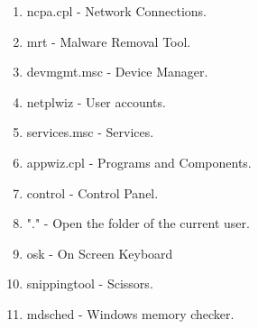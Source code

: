 \documentclass[11pt,a4paper,twoside]{article}
\begin{document}
\begin{enumerate}
\item ncpa.cpl 	-	 Network Connections.
\item mrt 	-	 Malware Removal Tool.
\item devmgmt.msc 	-	 Device Manager.
\item netplwiz 	-	 User accounts.
\item services.msc 	-	 Services.
\item appwiz.cpl 	-	 Programs and Components.
\item control 	-	 Control Panel.
\item "." 	-	Open the folder of the current user.
\item osk 	-	 On Screen Keyboard
\item snippingtool 	-	 Scissors.
\item mdsched 	-	 Windows memory checker.
\end{enumerate}		
\end{document}
